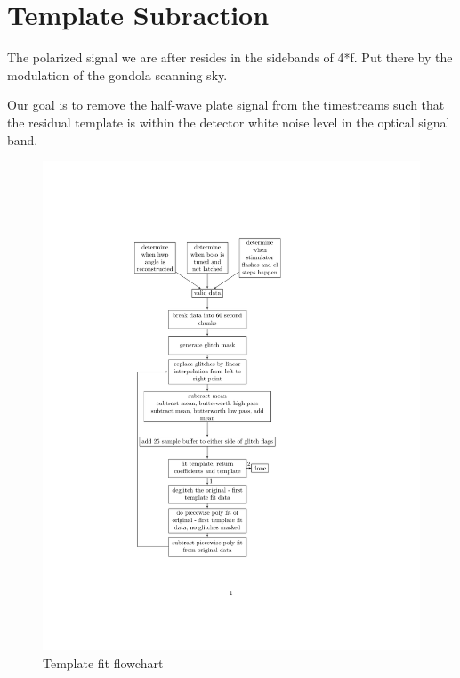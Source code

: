 \chapter{Template Subraction}
\label{template_subtraction_chapter}


The polarized signal we are after resides in the sidebands of 4*f. Put there by the modulation of the gondola scanning sky. 

Our goal is to remove the half-wave plate signal from the timestreams such that the residual template is within the detector white noise level in the optical signal band. 


\begin{figure}[htbp]
\begin{center}
\includegraphics[width=0.6 \textwidth]{figures/template_fit_block_diagram.pdf}
\caption{Template fit flowchart}
\label{fig:template_fit_flow}
\end{center}
\end{figure}

